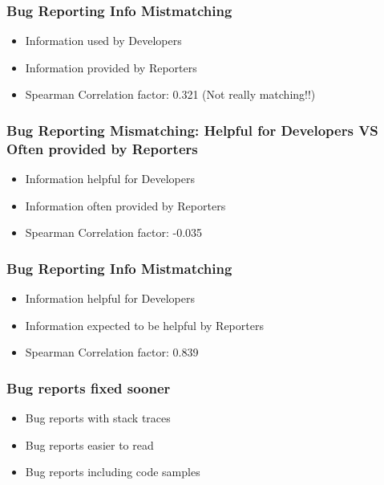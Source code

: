 \documentclass{beamer}
\begin{document}

\begin{frame}
 \frametitle{Bug Reporting Info Mistmatching }
 \begin{itemize}
    \item Information used by Developers 
    \item Information provided by Reporters
    \item Spearman Correlation factor: 0.321 (Not really matching!!)
 \end{itemize}
\end{frame}


\begin{frame}
\frametitle{Bug Reporting Mismatching: Helpful for Developers VS Often provided by Reporters }
 \begin{itemize}
    \item Information helpful for Developers 
    \item Information often provided by Reporters
    \item Spearman Correlation factor: -0.035
 \end{itemize}
\end{frame}


\begin{frame}
 \frametitle{Bug Reporting Info Mistmatching }
 \begin{itemize}
    \item Information helpful for Developers 
    \item Information expected to be helpful by Reporters
    \item Spearman Correlation factor: 0.839
 \end{itemize}
\end{frame}



\begin{frame}
 \frametitle{Bug reports fixed sooner}
 \begin{itemize}
    \item Bug reports with stack traces
    \item Bug reports easier to read
    \item Bug reports including code samples
 \end{itemize}
\end{frame}
\end{document}
